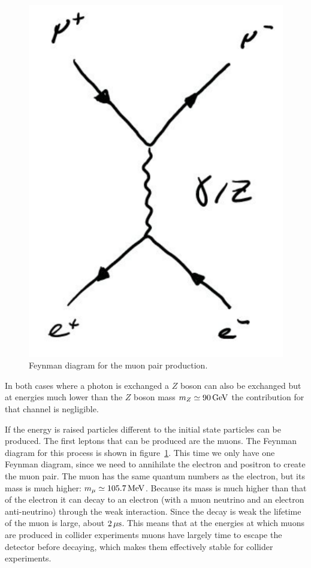 \documentclass[12pt]{article}
\begin{document}
\begin{figure}
\begin{center}
\includegraphics[scale=0.27,trim=0cm 3cm 0cm 5cm]{images/epemmupmum.png}
\end{center}
\caption{Feynman diagram for the muon pair production.}\label{fig:mumu}
\end{figure}
In both cases where a photon is exchanged a $Z$ boson can also be exchanged but at energies much lower than the $Z$ boson mass $m_Z\simeq 90\,{\rm GeV}$ the contribution for that channel is negligible. 

If the energy is raised particles different to the initial state particles can be produced. The first leptons that can be produced are the muons. The Feynman diagram for this process is shown in figure~\ref{fig:mumu}. This time we only have one Feynman diagram, since we need to annihilate the electron and positron to create the muon pair. The muon has the same quantum numbers as the electron, but its mass is much higher: $m_\mu\simeq 105.7\,{\rm MeV}$. Because its mass is much higher than that of the electron it can decay to an electron (with a muon neutrino and an electron anti-neutrino) through the weak interaction. Since the decay is weak the lifetime of the muon is large, about $2\,{\rm \mu s}$. This means that at the energies at which muons are produced in collider experiments muons have largely time to escape the detector before decaying, which makes them effectively stable for collider experiments. 
\end{document}
